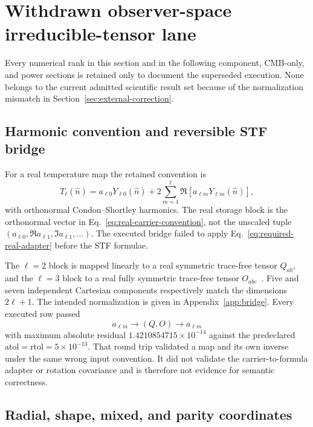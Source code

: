 \documentclass[11pt,a4paper]{article}
\newenvironment{warningbox}
  {\begin{center}\begin{minipage}{0.95\linewidth}\raggedright\color{warningbrown}}
  {\end{minipage}\end{center}}
\begin{document}
\section{Withdrawn observer-space irreducible-tensor lane}

\begin{warningbox}
Every numerical rank in this section and in the following component,
CMB-only, and power sections is retained only to document the superseded
execution.  None belongs to the current admitted scientific result set because
of the normalization mismatch in Section~\ref{sec:external-correction}.
\end{warningbox}

\subsection{Harmonic convention and reversible STF bridge}

For a real temperature map the retained convention is
\begin{equation}
T_\ell(\widehat n)=a_{\ell0}Y_{\ell0}(\widehat n)
+2\sum_{m=1}^{\ell}\Re\!\left[a_{\ell m}Y_{\ell m}(\widehat n)\right],
\label{eq:real-harmonics}
\end{equation}
with orthonormal Condon--Shortley harmonics.  The real storage block is
the orthonormal vector in Eq.~\eqref{eq:real-carrier-convention}, not the
unscaled tuple
$(a_{\ell0},\Re a_{\ell1},\Im a_{\ell1},\ldots)$.  The executed bridge failed
to apply Eq.~\eqref{eq:required-real-adapter} before the STF formulae.

The $\ell=2$ block is mapped linearly to a real symmetric trace-free tensor
$Q_{ab}$, and the $\ell=3$ block to a real fully symmetric trace-free tensor
$O_{abc}$~\cite{Thorne1980}.  Five and seven independent Cartesian components
respectively match the dimensions $2\ell+1$.  The intended normalization is
given in Appendix~\ref{app:bridge}.  Every executed row passed
\[
a_{\ell m}\longrightarrow(Q,O)\longrightarrow a_{\ell m}
\]
with maximum absolute residual
$1.4210854715\times10^{-14}$ against the predeclared
$\mathrm{atol}=\mathrm{rtol}=5\times10^{-13}$.  That round trip validated a
map and its own inverse under the same wrong input convention.  It did not
validate the carrier-to-formula adapter or rotation covariance and is therefore
not evidence for semantic correctness.

\subsection{Radial, shape, mixed, and parity coordinates}
\end{document}
